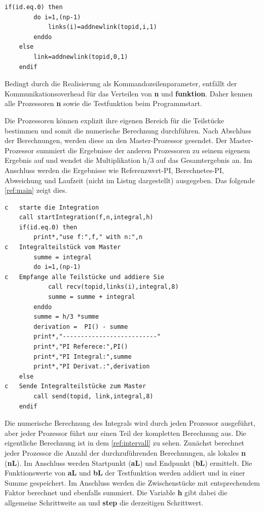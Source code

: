 \begin{lstlisting}[caption=Erzeugen der Stern-Topologie\label{ref:top}]
	if(id.eq.0) then
		do i=1,(np-1)
			links(i)=addnewlink(topid,i,1)
		enddo
	else
		link=addnewlink(topid,0,1)
	endif
\end{lstlisting}

Bedingt durch die Realisierung als Kommandozeilenparameter, entfällt der Kommunikationsoverhead für das Verteilen von \textbf{n} und \textbf{funktion}.
Daher kennen alle Prozessoren \textbf{n} sowie die Testfunktion beim Programmstart.

Die Prozessoren können explizit ihre eigenen Bereich für die Teilstücke bestimmen und somit die numerische Berechnung durchführen.
Nach Abschluss der Berechnungen, werden diese an den Master-Prozessor gesendet.
Der Master-Prozessor summiert die Ergebnisse der anderen Prozessoren zu seinem eigenem Ergebnis auf und wendet die Multiplikation h/3 auf das Gesamtergebnis an.
Im Anschluss werden die Ergebnisse wie Referenzwert-PI, Berechnetes-PI, Abweichung und Laufzeit (nicht im Listng dargestellt) ausgegeben. 
Das folgende \autoref{ref:main} zeigt dies.

\begin{lstlisting}[caption=Empfangen und Auswerten\label{ref:main}]
c	starte die Integration
	call startIntegration(f,n,integral,h)
	if(id.eq.0) then
		print*,"use f:",f," with n:",n
c  	Integralteilstück vom Master
		summe = integral
		do i=1,(np-1)
c 	Empfange alle Teilstücke und addiere Sie
			call recv(topid,links(i),integral,8)
			summe = summe + integral
		enddo
		summe = h/3 *summe
		derivation =  PI() - summe
		print*,"--------------------------"
		print*,"PI Referece:",PI()                   
		print*,"PI Integral:",summe
		print*,"PI Derivat.:",derivation
	else
c	Sende Integralteilstücke zum Master
		call send(topid, link,integral,8)
	endif
\end{lstlisting}

Die numerische Berechnung des Integrals wird durch jeden Prozessor ausgeführt, aber jeder Prozessor führt nur einen Teil der kompletten Berechnung aus.
Die eigentliche Berechnung ist in dem \autoref{ref:intervall} zu sehen.
Zunächst berechnet jeder Prozessor die Anzahl der durchzuführenden Berechnungen, als lokales \textbf{n} (\textbf{nL}).
Im Anschluss werden Startpunkt (\textbf{aL}) und Endpunkt (\textbf{bL}) ermittelt.
Die Funktionswerte von \textbf{aL} und \textbf{bL} der Testfunktion werden addiert und in einer Summe gespeichert.
Im Anschluss werden die Zwischenstücke mit entsprechendem Faktor berechnet und ebenfalls summiert.
Die Variable \textbf{h} gibt dabei die allgemeine Schrittweite an und \textbf{step} die derzeitigen Schrittwert.

